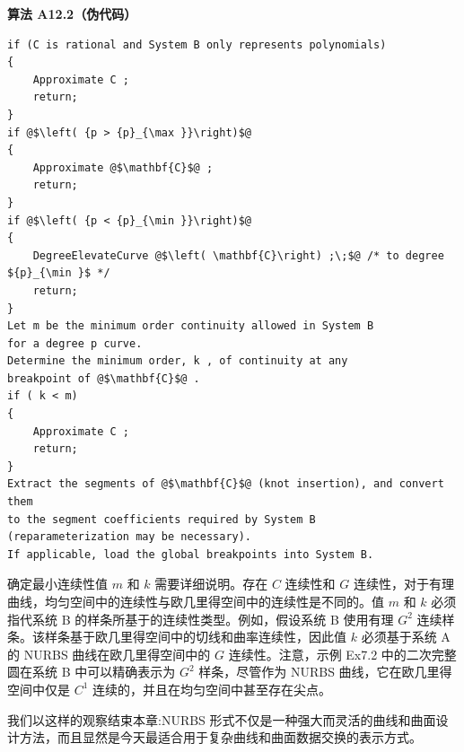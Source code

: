 \documentclass[../main.tex]{subfiles}
\begin{document}
\par\medskip\noindent\textbf{算法 A12.2（伪代码）}\par
\begin{verbatim}
if (C is rational and System B only represents polynomials)
{
    Approximate C ;
    return;
}
if @$\left( {p > {p}_{\max }}\right)$@
{
    Approximate @$\mathbf{C}$@ ;
    return;
}
if @$\left( {p < {p}_{\min }}\right)$@
{
    DegreeElevateCurve @$\left( \mathbf{C}\right) ;\;$@ /* to degree ${p}_{\min }$ */
    return;
}
Let m be the minimum order continuity allowed in System B
for a degree p curve.
Determine the minimum order, k , of continuity at any
breakpoint of @$\mathbf{C}$@ .
if ( k < m)
{
    Approximate C ;
    return;
}
Extract the segments of @$\mathbf{C}$@ (knot insertion), and convert them
to the segment coefficients required by System B
(reparameterization may be necessary).
If applicable, load the global breakpoints into System B.
\end{verbatim}

确定最小连续性值 \(m\) 和 \(k\) 需要详细说明。存在 \(C\) 连续性和 \(G\) 连续性，对于有理曲线，均匀空间中的连续性与欧几里得空间中的连续性是不同的。值 \(m\) 和 \(k\) 必须指代系统 B 的样条所基于的连续性类型。例如，假设系统 B 使用有理 \({G}^{2}\) 连续样条。该样条基于欧几里得空间中的切线和曲率连续性，因此值 \(k\) 必须基于系统 A 的 NURBS 曲线在欧几里得空间中的 \(G\) 连续性。注意，示例 Ex7.2 中的二次完整圆在系统 B 中可以精确表示为 \({G}^{2}\) 样条，尽管作为 NURBS 曲线，它在欧几里得空间中仅是 \({C}^{1}\) 连续的，并且在均匀空间中甚至存在尖点。

我们以这样的观察结束本章:NURBS 形式不仅是一种强大而灵活的曲线和曲面设计方法，而且显然是今天最适合用于复杂曲线和曲面数据交换的表示方式。



\clearpage
    
\end{document}
